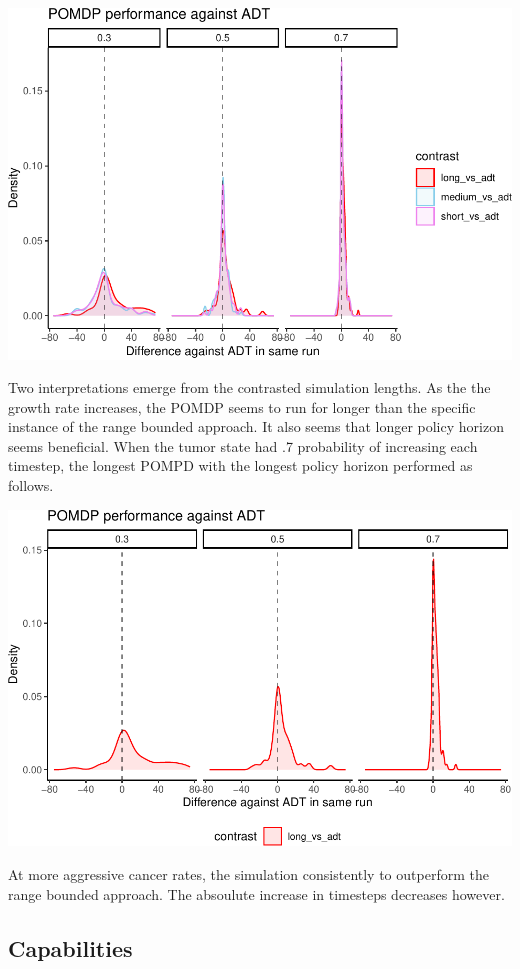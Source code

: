 \documentclass[notspecified,article,submit,moreauthors,pdftex]{Definitions/mdpi}
\begin{document}
\includegraphics{SocultPaper_files/figure-latex/unnamed-chunk-2-1.pdf}

Two interpretations emerge from the contrasted simulation lengths. As
the the growth rate increases, the POMDP seems to run for longer than
the specific instance of the range bounded approach. It also seems that
longer policy horizon seems beneficial. When the tumor state had .7
probability of increasing each timestep, the longest POMPD with the
longest policy horizon performed as follows.

\includegraphics{SocultPaper_files/figure-latex/unnamed-chunk-3-1.pdf}

At more aggressive cancer rates, the simulation consistently to
outperform the range bounded approach. The absoulute increase in
timesteps decreases however.

\subsection{Capabilities}\label{capabilities}
\end{document}
